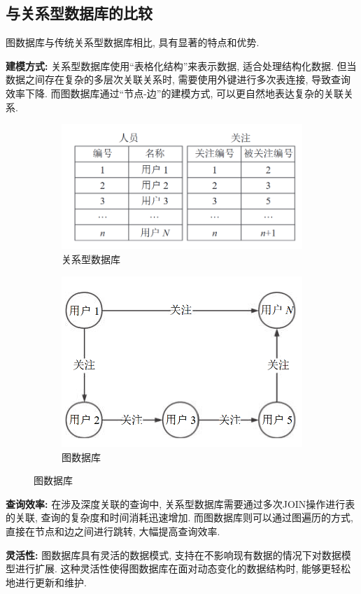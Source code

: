 \subsection{与关系型数据库的比较}

图数据库与传统关系型数据库相比, 具有显著的特点和优势.

\textbf{建模方式:} 关系型数据库使用“表格化结构”来表示数据, 适合处理结构化数据. 但当数据之间存在复杂的多层次关联关系时, 需要使用外键进行多次表连接, 导致查询效率下降. 而图数据库通过“节点-边”的建模方式, 可以更自然地表达复杂的关联关系.
\begin{figure}[H]
	\centering
	\begin{subfigure}[b]{0.45\textwidth}
		\centering
		\includegraphics[width=\textwidth]{images/1.png}
		\caption{关系型数据库}
	\end{subfigure}
	\hfill
	\begin{subfigure}[b]{0.45\textwidth}
		\centering
		\includegraphics[width=\textwidth]{images/2.png}
		\caption{图数据库}
	\end{subfigure}
\end{figure}


\textbf{查询效率:} 在涉及深度关联的查询中, 关系型数据库需要通过多次JOIN操作进行表的关联, 查询的复杂度和时间消耗迅速增加. 而图数据库则可以通过图遍历的方式, 直接在节点和边之间进行跳转, 大幅提高查询效率.

\textbf{灵活性:} 图数据库具有灵活的数据模式, 支持在不影响现有数据的情况下对数据模型进行扩展. 这种灵活性使得图数据库在面对动态变化的数据结构时, 能够更轻松地进行更新和维护.
\clearpage %
